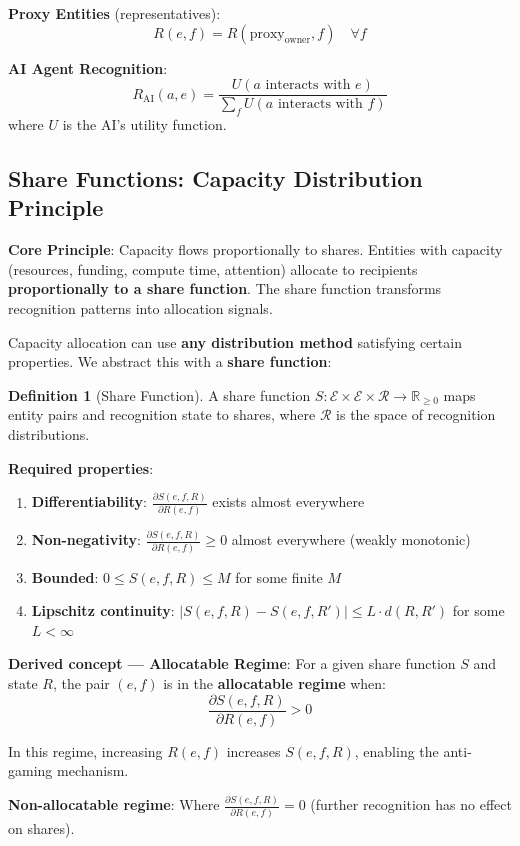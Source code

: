 \documentclass[11pt,a4paper]{article}
\theoremstyle{definition}
\newtheorem{definition}[theorem]{Definition}
\theoremstyle{remark}
\newcommand{\E}{\mathcal{E}}
\begin{document}
\textbf{Proxy Entities} (representatives):
\[ R(e,f) = R(\text{proxy}_\text{owner}, f) \quad \forall f \]

\textbf{AI Agent Recognition}:
\[ R_{\text{AI}}(a,e) = \frac{U(a \text{ interacts with } e)}{\sum_f U(a \text{ interacts with } f)} \]
where $U$ is the AI's utility function.

\subsection{Share Functions: Capacity Distribution Principle}

\textbf{Core Principle}: Capacity flows proportionally to shares. Entities with capacity (resources, funding, compute time, attention) allocate to recipients \textbf{proportionally to a share function}. The share function transforms recognition patterns into allocation signals.

Capacity allocation can use \textbf{any distribution method} satisfying certain properties. We abstract this with a \textbf{share function}:

\begin{definition}[Share Function]
A share function $S: \E \times \E \times \mathcal{R} \to \mathbb{R}_{\ge 0}$ maps entity pairs and recognition state to shares, where $\mathcal{R}$ is the space of recognition distributions.

\textbf{Required properties}:
\begin{enumerate}
\item \textbf{Differentiability}: $\frac{\partial S(e,f,R)}{\partial R(e,f)}$ exists almost everywhere
\item \textbf{Non-negativity}: $\frac{\partial S(e,f,R)}{\partial R(e,f)} \ge 0$ almost everywhere (weakly monotonic)
\item \textbf{Bounded}: $0 \le S(e,f,R) \le M$ for some finite $M$
\item \textbf{Lipschitz continuity}: $|S(e,f,R) - S(e,f,R')| \le L \cdot d(R, R')$ for some $L < \infty$
\end{enumerate}

\textbf{Derived concept --- Allocatable Regime}:
For a given share function $S$ and state $R$, the pair $(e,f)$ is in the \textbf{allocatable regime} when:
\[ \frac{\partial S(e,f,R)}{\partial R(e,f)} > 0 \]

In this regime, increasing $R(e,f)$ increases $S(e,f,R)$, enabling the anti-gaming mechanism.

\textbf{Non-allocatable regime}: Where $\frac{\partial S(e,f,R)}{\partial R(e,f)} = 0$ (further recognition has no effect on shares).
\end{definition}
\end{document}
